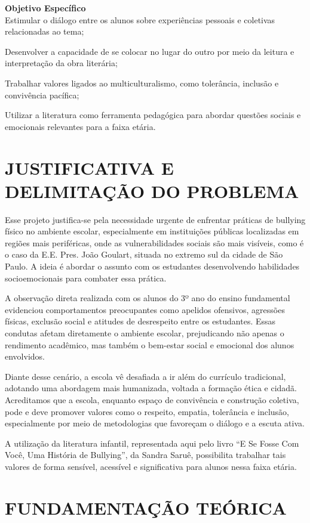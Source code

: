 \textbf{Objetivo Específico}\\
Estimular o diálogo entre os alunos sobre experiências pessoais e coletivas relacionadas ao tema;

Desenvolver a capacidade de se colocar no lugar do outro por meio da leitura e interpretação da obra literária;

Trabalhar valores ligados ao multiculturalismo, como tolerância, inclusão e convivência pacífica;

Utilizar a literatura como ferramenta pedagógica para abordar questões sociais e emocionais relevantes para a faixa etária.

\section{JUSTIFICATIVA E DELIMITAÇÃO DO PROBLEMA}

Esse projeto justifica-se pela necessidade urgente de enfrentar práticas de bullying físico no ambiente escolar, especialmente em instituições públicas localizadas em regiões mais periféricas, onde as vulnerabilidades sociais são mais visíveis, como é o caso da E.E. Pres. João Goulart, situada no extremo sul da cidade de São Paulo. A ideia é abordar o assunto com os estudantes desenvolvendo habilidades socioemocionais para combater essa prática.

A observação direta realizada com os alunos do 3º ano do ensino fundamental evidenciou comportamentos preocupantes como apelidos ofensivos, agressões físicas, exclusão social e atitudes de desrespeito entre os estudantes. Essas condutas afetam diretamente o ambiente escolar, prejudicando não apenas o rendimento acadêmico, mas também o bem-estar social e emocional dos alunos envolvidos.

Diante desse cenário, a escola vê desafiada a ir além do currículo tradicional, adotando uma abordagem mais humanizada, voltada a formação ética e cidadã. Acreditamos que a escola, enquanto espaço de convivência e construção coletiva, pode e deve promover valores como o respeito, empatia, tolerância e inclusão, especialmente por meio de metodologias que favoreçam o diálogo e a escuta ativa.

A utilização da literatura infantil, representada aqui pelo livro “E Se Fosse Com Você, Uma História de Bullying”, da Sandra Saruê, possibilita trabalhar tais valores de forma sensível, acessível e significativa para alunos nessa faixa etária. 


\section{FUNDAMENTAÇÃO TEÓRICA}


